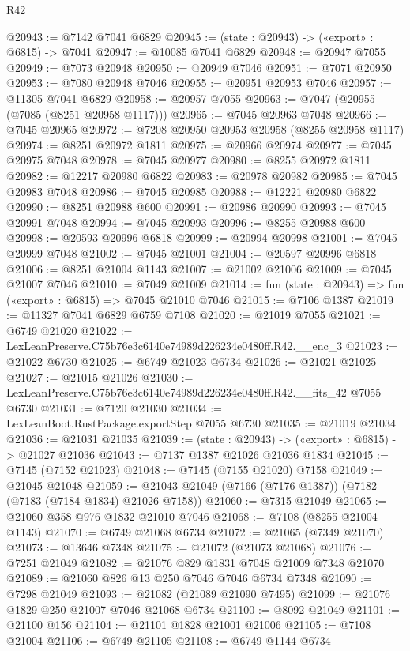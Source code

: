 \begin{lexlean}{R42}
\begin{coremodule}
{@20943 := @7142 @7041 @6829
@20945 := (state : @20943) -> («export» : @6815) -> @7041
@20947 := @10085 @7041 @6829
@20948 := @20947 @7055
@20949 := @7073 @20948
@20950 := @20949 @7046
@20951 := @7071 @20950
@20953 := @7080 @20948 @7046
@20955 := @20951 @20953 @7046
@20957 := @11305 @7041 @6829
@20958 := @20957 @7055
@20963 := @7047 (@20955 (@7085 (@8251 @20958 @1117)))
@20965 := @7045 @20963 @7048
@20966 := @7045 @20965
@20972 := @7208 @20950 @20953 @20958 (@8255 @20958 @1117)
@20974 := @8251 @20972 @1811
@20975 := @20966 @20974
@20977 := @7045 @20975 @7048
@20978 := @7045 @20977
@20980 := @8255 @20972 @1811
@20982 := @12217 @20980 @6822
@20983 := @20978 @20982
@20985 := @7045 @20983 @7048
@20986 := @7045 @20985
@20988 := @12221 @20980 @6822
@20990 := @8251 @20988 @600
@20991 := @20986 @20990
@20993 := @7045 @20991 @7048
@20994 := @7045 @20993
@20996 := @8255 @20988 @600
@20998 := @20593 @20996 @6818
@20999 := @20994 @20998
@21001 := @7045 @20999 @7048
@21002 := @7045 @21001
@21004 := @20597 @20996 @6818
@21006 := @8251 @21004 @1143
@21007 := @21002 @21006
@21009 := @7045 @21007 @7046
@21010 := @7049 @21009
@21014 := fun (state : @20943) => fun («export» : @6815) => @7045 @21010 @7046
@21015 := @7106 @1387
@21019 := @11327 @7041 @6829 @6759 @7108
@21020 := @21019 @7055
@21021 := @6749 @21020
@21022 := LexLeanPreserve.C75b76e3c6140e74989d226234e0480ff.R42.__enc_3
@21023 := @21022 @6730
@21025 := @6749 @21023 @6734
@21026 := @21021 @21025
@21027 := @21015 @21026
@21030 := LexLeanPreserve.C75b76e3c6140e74989d226234e0480ff.R42.__fits_42 @7055 @6730
@21031 := @7120 @21030
@21034 := LexLeanBoot.RustPackage.exportStep @7055 @6730
@21035 := @21019 @21034
@21036 := @21031 @21035
@21039 := (state : @20943) -> («export» : @6815) -> @21027 @21036
@21043 := @7137 @1387 @21026 @21036 @1834
@21045 := @7145 (@7152 @21023)
@21048 := @7145 (@7155 @21020) @7158
@21049 := @21045 @21048
@21059 := @21043 @21049 (@7166 (@7176 @1387)) (@7182 (@7183 (@7184 @1834) @21026 @7158))
@21060 := @7315 @21049
@21065 := @21060 @358 @976 @1832 @21010 @7046
@21068 := @7108 (@8255 @21004 @1143)
@21070 := @6749 @21068 @6734
@21072 := @21065 (@7349 @21070)
@21073 := @13646 @7348
@21075 := @21072 (@21073 @21068)
@21076 := @7251 @21049
@21082 := @21076 @829 @1831 @7048 @21009 @7348 @21070
@21089 := @21060 @826 @13 @250 @7046 @7046 @6734 @7348
@21090 := @7298 @21049
@21093 := @21082 (@21089 @21090 @7495)
@21099 := @21076 @1829 @250 @21007 @7046 @21068 @6734
@21100 := @8092 @21049
@21101 := @21100 @156
@21104 := @21101 @1828 @21001 @21006
@21105 := @7108 @21004
@21106 := @6749 @21105
@21108 := @6749 @1144 @6734
}
\end{coremodule}
\end{lexlean}
